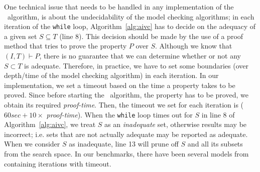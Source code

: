 One technical issue that needs to
be handled in any implementation of the \aivcalg ~algorithm,
is about the undecidability of the model checking algorithms;
in each iteration of the \texttt{while} loop, Algorithm~\ref{alg:aivc}
has to decide on the adequacy of a given set $S \subseteq T$ (line 8).
This decision should be made by the use of a proof method that
tries to prove the property $P$ over $S$. Although we know that $(I, T) \vdash P$,
there is no guarantee that we can determine whether or not any $S \subset T$ is adequate.
Therefore, in practice, we have to set some boundaries
(over depth/time of the model checking algorithm) in each iteration.
In our implementation, we set a timeout based on the time a property takes to be proved.
Since before starting the \aivcalg ~algorithm, the property has to be proved,
we obtain its required \emph{proof-time}.
Then, the timeout we set for each iteration is ($60 sec  + 10 \times$ \emph{proof-time}).
When the \texttt{while} loop times out for $S$ in line 8 of Algorithm~\ref{alg:aivc},
we treat $S$ as an \emph{inadequate} set,
otherwise results may be incorrect; i.e. sets that are not actually adequate may be reported as adequate. When we consider $S$ as inadequate, line 13 will prune off $S$ and all its subsets from the search space.
In our benchmarks, there have been several models from~\cite{Hagen08:FMCAD} containing iterations with timeout.


%

 